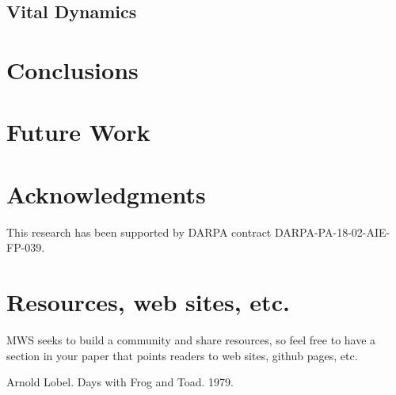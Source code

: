 \documentclass[11pt]{article}
\begin{document}
\subsection{Vital Dynamics}

\section{Conclusions}

\section{Future Work}

\section{Acknowledgments}

This research has been supported by DARPA contract DARPA-PA-18-02-AIE-FP-039.

\section{Resources, web sites, etc.}

MWS seeks to build a community and share resources, so feel free to have a section in your paper that points readers to web sites, github pages, etc.


\begin{thebibliography}{9}

Arnold Lobel.  Days with Frog and Toad. 1979.


\end{thebibliography}
\end{document}

